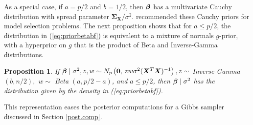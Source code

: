 \documentclass[12pt]{article}
\newtheorem{proposition}{Proposition}
\newcommand{\X}{{\bm  X}}
\newcommand{\Sigmabf}{{\mathbf \Sigma}}
\newcommand{\zerobf}{{\mathbf 0}}
\newcommand{\greekbold}[1]{\mbox{\boldmath $#1$}}
\newcommand{\betabf}{\greekbold{\beta}}
\newcommand{\s}{{\sigma^2}}
\begin{document}
As a special case, if $a=p/2$ and $b=1/2$, then $\betabf$ has a multivariate Cauchy distribution with spread parameter $\Sigmabf_\X/\s$.
\cite{zellner1980posterior} recommended these Cauchy priors for model selection problems.
The next proposition shows that for  $a \leq p/2$, the distribution in (\ref{eq:priorbetabf}) is equivalent to a mixture of normals $g$-prior, with a hyperprior on $g$ that is the product of Beta and Inverse-Gamma distributions.

\begin{proposition}\label{gibbs.uoe}
If $\betabf\mid \sigma^2, z,w \sim N_p\left(\zerobf, \, zw  \sigma^2 (\X^T\X)^{-1} \right), z \sim $ Inverse-Gamma $(b, n/2), $ $w \sim $ Beta $(a, p/2-a)$, and $a \leq p/2 $, then $\betabf \mid  \sigma^2$ has the distribution given by the density in (\ref{eq:priorbetabf}).
\end{proposition}
This representation eases the posterior computations for a Gibbs sampler discussed in Section \ref{post.comp}.


\end{document}

